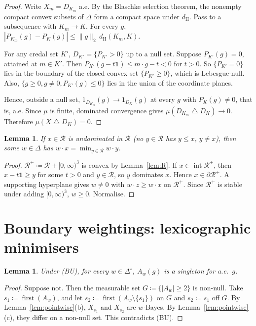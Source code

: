 \documentclass[11pt]{article}
\newtheorem{lemma}[theorem]{Lemma}
\theoremstyle{remark}
\newcommand{\one}{\mathbf 1}
\newcommand{\Di}{\Delta^{\circ}}
\newcommand{\Rr}{\mathcal R}
\newcommand{\sd}{\mathbin{\triangle}}
\newcommand{\dH}{d_{\mathrm H}}
\newcommand{\first}{\operatorname{first}}
\begin{document}
\begin{proof}
Write $X_m=D_{K_m}$ a.e. By the Blaschke selection theorem, the nonempty compact convex subsets of $\Delta$ form a compact space under $\dH$. Pass to a subsequence with $K_m\to K$. For every $g$, $|P_{K_m}(g)-P_K(g)|\le\|g\|_2\,\dH(K_m,K)$.

For any credal set $K'$, $D_{K'}=\{P_{K'}>0\}$ up to a null set. Suppose $P_{K'}(g)=0$, attained at $m\in K'$. Then $P_{K'}(g-t\one)\le m\cdot g-t<0$ for $t>0$. So $\{P_{K'}=0\}$ lies in the boundary of the closed convex set $\{P_{K'}\ge0\}$, which is Lebesgue-null. Also, $\{g\ge0,g\ne0,P_{K'}(g)\le0\}$ lies in the union of the coordinate planes.

Hence, outside a null set, $1_{D_{K_m}}(g)\to1_{D_K}(g)$ at every $g$ with $P_K(g)\ne0$, that is, a.e. Since $\mu$ is finite, dominated convergence gives $\mu(D_{K_m}\sd D_K)\to0$. Therefore $\mu(X\sd D_K)=0$.
\end{proof}

\begin{lemma}\label{lem:support}
If $x\in\Rr$ is undominated in $\Rr$ (no $y\in\Rr$ has $y\le x$, $y\ne x$), then some $w\in\Delta$ has $w\cdot x=\min_{y\in\Rr}w\cdot y$.
\end{lemma}

\begin{proof}
$\Rr^+\coloneqq\Rr+[0,\infty)^3$ is convex by Lemma~\ref{lem:R}. If $x\in\operatorname{int}\Rr^+$, then $x-t\one\ge y$ for some $t>0$ and $y\in\Rr$, so $y$ dominates $x$. Hence $x\in\partial\Rr^+$. A supporting hyperplane gives $w\ne0$ with $w\cdot z\ge w\cdot x$ on $\Rr^+$. Since $\Rr^+$ is stable under adding $[0,\infty)^3$, $w\ge0$. Normalise.
\end{proof}

\section{Boundary weightings: lexicographic minimisers}\label{sec:lex}

\begin{lemma}\label{lem:BUpoint}
Under \textup{(BU)}, for every $w\in\Di$, $A_w(g)$ is a singleton for a.e.\ $g$.
\end{lemma}

\begin{proof}
Suppose not. Then the measurable set $G\coloneqq\{|A_w|\ge2\}$ is non-null. Take $s_1\coloneqq\first(A_w)$, and let $s_2\coloneqq\first(A_w\setminus\{s_1\})$ on $G$ and $s_2\coloneqq s_1$ off $G$. By Lemma~\ref{lem:pointwise}(b), $X_{s_1}$ and $X_{s_2}$ are $w$-Bayes. By Lemma~\ref{lem:pointwise}(c), they differ on a non-null set. This contradicts (BU).
\end{proof}
\end{document}
